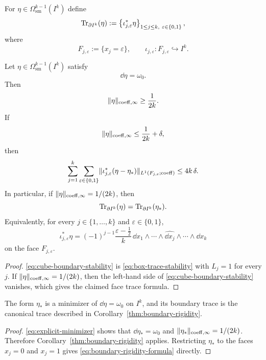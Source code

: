 \begin{definition}
\label{def:face-trace}
For $\eta\in\Omega^{k-1}_{\mathrm{sm}}(I^k)$ define
\[
\Tr_{\partial I^k}(\eta):=
\left\{\iota_{j,\varepsilon}^\ast\eta\right\}_{1\le j\le k,\ \varepsilon\in\{0,1\}},
\]
where
\[
F_{j,\varepsilon}:=\{x_j=\varepsilon\},
\qquad
\iota_{j,\varepsilon}:F_{j,\varepsilon}\hookrightarrow I^k.
\]
\end{definition}

\begin{corollary}
\label{thm:boundary-rigidity}
Let $\eta\in\Omega^{k-1}_{\mathrm{sm}}(I^k)$ satisfy
\[
\dd\eta=\omega_0.
\]
Then
\[
\lVert \eta \rVert_{\mathrm{coeff},\infty}\ge \frac{1}{2k}.
\]
If
\[
\lVert \eta \rVert_{\mathrm{coeff},\infty}\le \frac{1}{2k}+\delta,
\]
then
\begin{equation}
\label{eq:cube-boundary-stability}
\sum_{j=1}^k\sum_{\varepsilon\in\{0,1\}}
\lVert \iota_{j,\varepsilon}^\ast(\eta-\eta_\ast) \rVert_{L^1(F_{j,\varepsilon};\mathrm{coeff})}
\le
4k\,\delta.
\end{equation}
In particular, if $\lVert \eta \rVert_{\mathrm{coeff},\infty}=1/(2k)$, then
\[
\operatorname{Tr}_{\partial I^k}(\eta)=\operatorname{Tr}_{\partial I^k}(\eta_\ast).
\]
Equivalently, for every $j\in\{1,\dots,k\}$ and $\varepsilon\in\{0,1\}$,
\begin{equation}
\label{eq:boundary-rigidity-formula}
\iota_{j,\varepsilon}^\ast\eta
=
(-1)^{j-1}\frac{\varepsilon-\tfrac12}{k}\,
\dd x_1\wedge\cdots\wedge\widehat{\dd x_j}\wedge\cdots\wedge \dd x_k
\end{equation}
on the face $F_{j,\varepsilon}$.
\end{corollary}

\begin{proof}
\eqref{eq:cube-boundary-stability} is \eqref{eq:box-trace-stability} with
$L_j=1$ for every $j$. If $\lVert \eta \rVert_{\mathrm{coeff},\infty}=1/(2k)$, then the
left-hand side of \eqref{eq:cube-boundary-stability} vanishes, which gives the
claimed face trace formula.
\end{proof}

\begin{corollary}
\label{cor:explicit-minimizer}
The form $\eta_\ast$ is a minimizer of $\dd\eta=\omega_0$ on $I^k$, and its
boundary trace is the canonical trace described in
Corollary~\ref{thm:boundary-rigidity}.
\end{corollary}

\begin{proof}
\eqref{eq:explicit-minimizer} shows that $\dd\eta_\ast=\omega_0$ and
$\lVert \eta_\ast \rVert_{\mathrm{coeff},\infty}=1/(2k)$. Therefore
Corollary~\ref{thm:boundary-rigidity} applies. Restricting $\eta_\ast$ to the
faces $x_j=0$ and $x_j=1$ gives
\eqref{eq:boundary-rigidity-formula} directly.
\end{proof}

